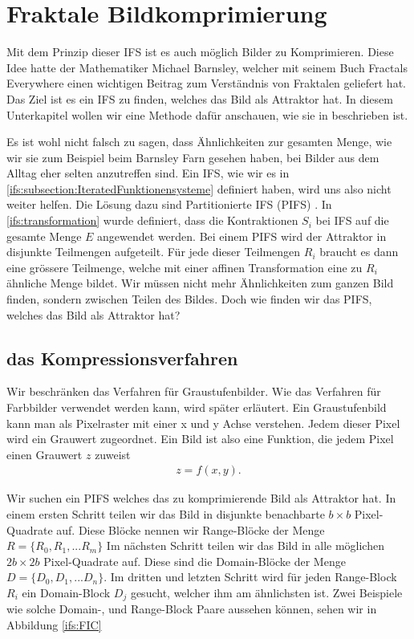 %
%
%
\section{Fraktale Bildkomprimierung
\label{ifs:section:teil3}}
Mit dem Prinzip dieser IFS ist es auch möglich Bilder zu Komprimieren.
Diese Idee hatte der Mathematiker Michael Barnsley, welcher mit seinem Buch Fractals Everywhere einen wichtigen Beitrag zum Verständnis von Fraktalen geliefert hat.
Das Ziel ist es ein IFS zu finden, welches das Bild als Attraktor hat.
In diesem Unterkapitel wollen wir eine Methode dafür anschauen, wie sie in \cite{ifs:Rousseau2012} beschrieben ist.

Es ist wohl nicht falsch zu sagen, dass Ähnlichkeiten zur gesamten Menge, wie wir sie zum Beispiel beim Barnsley Farn gesehen haben, bei Bilder aus dem Alltag eher selten anzutreffen sind.
Ein IFS, wie wir es in \ref{ifs:subsection:IteratedFunktionensysteme} definiert haben, wird uns also nicht weiter helfen.
Die Lösung dazu sind Partitionierte IFS (PIFS) \cite{ifs:pifs}.
In \ref{ifs:transformation} wurde definiert, dass die Kontraktionen $S_i$ bei IFS auf die gesamte Menge $E$ angewendet werden.
Bei einem PIFS wird der Attraktor in disjunkte Teilmengen aufgeteilt. 
Für jede dieser Teilmengen $R_i$ braucht es dann eine grössere Teilmenge, welche mit einer affinen Transformation eine zu $R_i$ ähnliche Menge bildet.
Wir müssen nicht mehr Ähnlichkeiten zum ganzen Bild finden, sondern zwischen Teilen des Bildes.
Doch wie finden wir das PIFS, welches das Bild als Attraktor hat?

\subsection{das Kompressionsverfahren
\label{ifs:subsection:malorum}}
Wir beschränken das Verfahren für Graustufenbilder. Wie das Verfahren für Farbbilder verwendet werden kann, wird später erläutert.
Ein Graustufenbild kann man als Pixelraster mit einer x und y Achse verstehen.
Jedem dieser Pixel wird ein Grauwert zugeordnet.
Ein Bild ist also eine Funktion, die jedem Pixel einen Grauwert $z$ zuweist
\begin{align*}
	z = f(x,y).
\end{align*} 

Wir suchen ein PIFS welches das zu komprimierende Bild als Attraktor hat.
In einem ersten Schritt teilen wir das Bild in disjunkte benachbarte $b \times b$ Pixel-Quadrate auf. Diese Blöcke nennen wir Range-Blöcke der Menge $R=\{R_0,R_1,...R_m\}$
Im nächsten Schritt teilen wir das Bild in alle möglichen $2b \times 2b$ Pixel-Quadrate auf. Diese sind die Domain-Blöcke der Menge $D = \{D_0,D_1,...D_n\}$. 
Im dritten und letzten Schritt wird für jeden Range-Block $R_i$ ein Domain-Block $D_j$ gesucht, welcher ihm am ähnlichsten ist.
Zwei Beispiele wie solche Domain-, und Range-Block Paare aussehen können, sehen wir in Abbildung \ref{ifs:FIC}

